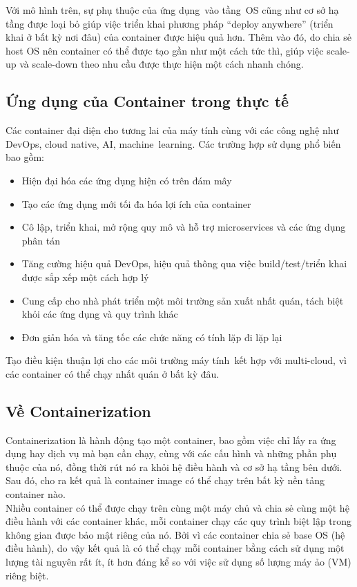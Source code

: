 \documentclass[12pt,a4paper]{report}
\begin{document}
		Với mô hình trên, sự phụ thuộc của ứng dụng vào tầng OS cũng như cơ sở hạ tầng được loại bỏ giúp việc triển khai phương pháp “deploy anywhere” (triển khai ở bất kỳ nơi đâu) của container được hiệu quả hơn. Thêm vào đó, do chia sẻ host OS nên container có thể được tạo gần như một cách tức thì, giúp việc scale-up và scale-down theo nhu cầu được thực hiện một cách nhanh chóng.
		\subsection{Ứng dụng của Container trong thực tế}
		\hspace{0.6cm}Các container đại diện cho tương lai của máy tính cùng với các công nghệ như DevOps, cloud native, AI, machine learning. Các trường hợp sử dụng phổ biến bao gồm:
		\begin{itemize}
		\item Hiện đại hóa các ứng dụng hiện có trên đám mây
		\item Tạo các ứng dụng mới tối đa hóa lợi ích của container
		\item Cô lập, triển khai, mở rộng quy mô và hỗ trợ microservices và các ứng dụng phân tán
		\item Tăng cường hiệu quả DevOps, hiệu quả thông qua việc build/test/triển khai được sắp xếp một cách hợp lý
		\item Cung cấp cho nhà phát triển một môi trường sản xuất nhất quán, tách biệt khỏi các ứng dụng và quy trình khác
		\item Đơn giản hóa và tăng tốc các chức năng có tính lặp đi lặp lại\\
		\end{itemize}
		
		Tạo điều kiện thuận lợi cho các môi trường máy tính kết hợp với multi-cloud, vì các container có thể chạy nhất quán ở bất kỳ đâu.
		\subsection{Về Containerization}
		\hspace{0.6cm}Containerization là hành động tạo một container, bao gồm việc chỉ lấy ra ứng dụng hay dịch vụ mà bạn cần chạy, cùng với các cấu hình và những phần phụ thuộc của nó, đồng thời rút nó ra khỏi hệ điều hành và cơ sở hạ tầng bên dưới. Sau đó, cho ra kết quả là container image có thể chạy trên bất kỳ nền tảng container nào.\\
		
		Nhiều container có thể được chạy trên cùng một máy chủ và chia sẻ cùng một hệ điều hành với các container khác, mỗi container chạy các quy trình biệt lập trong không gian được bảo mật riêng của nó. Bởi vì các container chia sẻ base OS (hệ điều hành), do vậy kết quả là có thể chạy mỗi container bằng cách sử dụng một lượng tài nguyên rất ít, ít hơn đáng kể so với việc sử dụng số lượng máy ảo (VM) riêng biệt.
\end{document}

